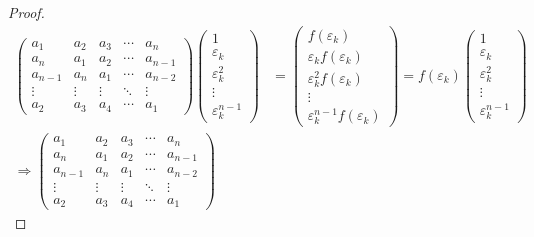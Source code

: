 \documentclass[class=nhvh-linear-algebra,crop=false]{standalone}
\begin{document}
\begin{proof}
	\begingroup{}
	\allowdisplaybreaks{}
	\begin{align*}
		\begin{pmatrix}
			a_{1}   & a_{2}  & a_{3}  & \cdots & a_{n}   \\
			a_{n}   & a_{1}  & a_{2}  & \cdots & a_{n-1} \\
			a_{n-1} & a_{n}  & a_{1}  & \cdots & a_{n-2} \\
			\vdots  & \vdots & \vdots & \ddots & \vdots  \\
			a_{2}   & a_{3}  & a_{4}  & \cdots & a_{1}
		\end{pmatrix}
		\begin{pmatrix}
			1                   \\
			\varepsilon_{k}     \\
			\varepsilon_{k}^{2} \\
			\vdots              \\
			\varepsilon_{k}^{n-1}
		\end{pmatrix}
		 & =
		\begin{pmatrix}
			f(\varepsilon_{k})                    \\
			\varepsilon_{k}f(\varepsilon_{k})     \\
			\varepsilon_{k}^{2}f(\varepsilon_{k}) \\
			\vdots                                \\
			\varepsilon_{k}^{n-1}f(\varepsilon_{k})
		\end{pmatrix}
		= f(\varepsilon_{k})
		\begin{pmatrix}
			1                   \\
			\varepsilon_{k}     \\
			\varepsilon_{k}^{2} \\
			\vdots              \\
			\varepsilon_{k}^{n-1}
		\end{pmatrix}                   \\
		\Rightarrow
		\begin{pmatrix}
			a_{1}   & a_{2}  & a_{3}  & \cdots & a_{n}   \\
			a_{n}   & a_{1}  & a_{2}  & \cdots & a_{n-1} \\
			a_{n-1} & a_{n}  & a_{1}  & \cdots & a_{n-2} \\
			\vdots  & \vdots & \vdots & \ddots & \vdots  \\
			a_{2}   & a_{3}  & a_{4}  & \cdots & a_{1}
		\end{pmatrix}

\end{align*}
\end{proof}
\end{document}
